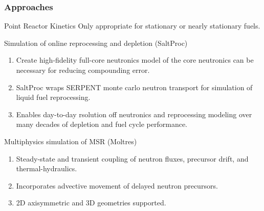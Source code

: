 \begin{frame}
  \frametitle{Approaches}
                  \vspace*{-0.1in}
              \begin{block}{Point Reactor Kinetics \cite{huff_pyrk:_2015}}
                Only appropriate for stationary or nearly stationary fuels.
              \end{block}

              \begin{block}{Simulation of online reprocessing and depletion 
                      (SaltProc)\cite{rykhlevskii_arfc/saltproc:_2018,rykhlevskii_online_2017}}
               \begin{enumerate}
                \item Create high-fidelity full-core neutronics model of the 
                        core neutronics can be necessary for reducing 
                               compounding error.
                \item SaltProc wraps SERPENT monte carlo neutron transport for 
                        simulation of liquid fuel reprocessing.
                \item Enables day-to-day rsolution off neutronics and reprocessing modeling 
                        over many decades of depletion and fuel cycle performance.
               \end{enumerate}
               \end{block}

              \begin{block}{Multiphysics simulation of \gls{MSR} (Moltres)\cite{lindsay_introduction_2018}}
               \begin{enumerate}
                \item Steady-state and transient coupling of neutron fluxes, 
                        precursor drift, and thermal-hydraulics.
                \item Incorporates advective movement of delayed neutron precursors.
                \item 2D axisymmetric and 3D geometries supported.
               \end{enumerate}
               \end{block}

\end{frame}
